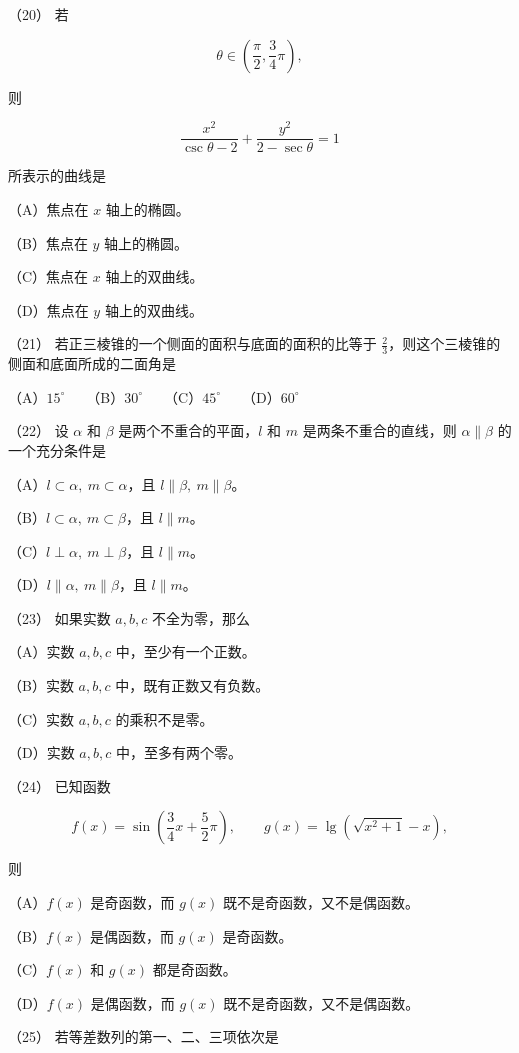 \begin{answer}
（20） 若

\nopagebreak[4]
\[
\theta\in\left(\frac\pi2,\frac34\pi\right),
\]

则

\nopagebreak[4]
\[
\frac{x^2}{\csc\theta-2}+\frac{y^2}{2-\sec\theta}=1
\]

所表示的曲线是

（A）焦点在 $x$ 轴上的椭圆。

（B）焦点在 $y$ 轴上的椭圆。

（C）焦点在 $x$ 轴上的双曲线。

（D）焦点在 $y$ 轴上的双曲线。

（21） 若正三棱锥的一个侧面的面积与底面的面积的比等于 $\frac23$，则这个三棱锥的侧面和底面所成的二面角是

（A）$15^\circ$　　（B）$30^\circ$　　（C）$45^\circ$　　（D）$60^\circ$

（22） 设 $\alpha$ 和 $\beta$ 是两个不重合的平面，$l$ 和 $m$ 是两条不重合的直线，则 $\alpha\parallel\beta$ 的一个充分条件是

（A）$l\subset\alpha,\ m\subset\alpha$，且 $l\parallel\beta,\ m\parallel\beta$。

（B）$l\subset\alpha,\ m\subset\beta$，且 $l\parallel m$。

（C）$l\perp\alpha,\ m\perp\beta$，且 $l\parallel m$。

（D）$l\parallel\alpha,\ m\parallel\beta$，且 $l\parallel m$。

（23） 如果实数 $a,b,c$ 不全为零，那么

（A）实数 $a,b,c$ 中，至少有一个正数。

（B）实数 $a,b,c$ 中，既有正数又有负数。

（C）实数 $a,b,c$ 的乘积不是零。

（D）实数 $a,b,c$ 中，至多有两个零。

（24） 已知函数

\nopagebreak[4]
\[
f(x)=\sin\left(\frac34x+\frac52\pi\right),
\qquad
g(x)=\lg\left(\sqrt{x^2+1}-x\right),
\]

则

（A）$f(x)$ 是奇函数，而 $g(x)$ 既不是奇函数，又不是偶函数。

（B）$f(x)$ 是偶函数，而 $g(x)$ 是奇函数。

（C）$f(x)$ 和 $g(x)$ 都是奇函数。

（D）$f(x)$ 是偶函数，而 $g(x)$ 既不是奇函数，又不是偶函数。

（25） 若等差数列的第一、二、三项依次是


\end{answer}
